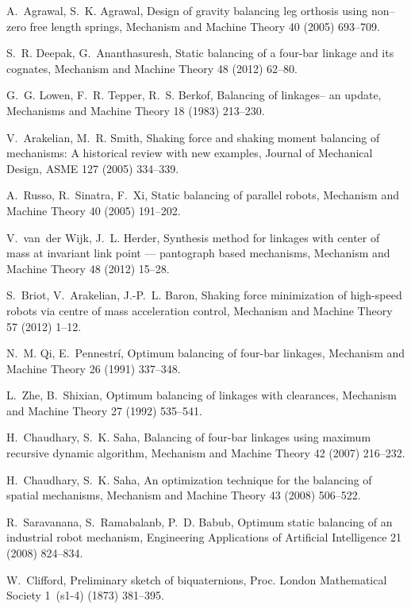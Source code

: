 \documentclass[11pt]{article}
\begin{document}
\begin{thebibliography}{10}
A.~Agrawal, S.~K. Agrawal, Design of gravity balancing leg orthosis using
  non--zero free length springs, Mechanism and Machine Theory 40 (2005)
  693--709.

S.~R. Deepak, G.~Ananthasuresh, Static balancing of a four-bar linkage and its
  cognates, Mechanism and Machine Theory 48 (2012) 62--80.

G.~G. Lowen, F.~R. Tepper, R.~S. Berkof, Balancing of linkages-- an update,
  Mechanisms and Machine Theory 18 (1983) 213--230.

V.~Arakelian, M.~R. Smith, Shaking force and shaking moment balancing of
  mechanisms: A historical review with new examples, Journal of Mechanical
  Design, ASME 127 (2005) 334--339.

A.~Russo, R.~Sinatra, F.~Xi, Static balancing of parallel robots, Mechanism and
  Machine Theory 40 (2005) 191--202.

V.~van~der Wijk, J.~L. Herder, Synthesis method for linkages with center of
  mass at invariant link point --- pantograph based mechanisms, Mechanism and
  Machine Theory 48 (2012) 15--28.

S.~Briot, V.~Arakelian, J.-P.~L. Baron, Shaking force minimization of
  high-speed robots via centre of mass acceleration control, Mechanism and
  Machine Theory 57 (2012) 1--12.

N.~M. Qi, E.~{Pennestr\'i}, Optimum balancing of four-bar linkages, Mechanism
  and Machine Theory 26 (1991) 337--348.

L.~Zhe, B.~Shixian, Optimum balancing of linkages with clearances, Mechanism
  and Machine Theory 27 (1992) 535--541.

H.~Chaudhary, S.~K. Saha, Balancing of four-bar linkages using maximum
  recursive dynamic algorithm, Mechanism and Machine Theory 42 (2007) 216--232.

H.~Chaudhary, S.~K. Saha, An optimization technique for the balancing of
  spatial mechanisms, Mechanism and Machine Theory 43 (2008) 506--522.

R.~Saravanana, S.~Ramabalanb, P.~D. Babub, Optimum static balancing of an
  industrial robot mechanism, Engineering Applications of Artificial
  Intelligence 21 (2008) 824--834.

W.~Clifford, Preliminary sketch of biquaternions, Proc. London Mathematical
  Society 1~(s1-4) (1873) 381--395.


\end{thebibliography}
\end{document}

